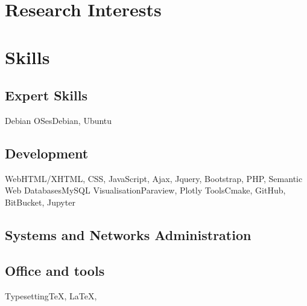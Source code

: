 \documentclass[11pt,a4paper,nolmodern]{moderncv}
\begin{document}

\maketitle

\section{Research Interests}

\section{Skills}

\subsection{Expert Skills}
           {Debian OSes}{Debian\contributor, Ubuntu\developer}

\subsection{Development}
           {Web}{HTML/XHTML, CSS, JavaScript, Ajax, Jquery, Bootstrap, PHP, Semantic Web}
           {Databases}{MySQL}
           {Visualisation}{Paraview, Plotly}
           {Tools}{Cmake, GitHub, BitBucket, Jupyter}
\subsection{Systems and Networks Administration}

\subsection{Office and tools}
{Typesetting}{\TeX{}, \LaTeX{}, \LuaTeX{}}
\end{document}
